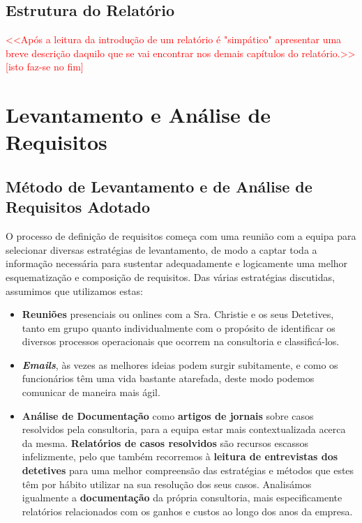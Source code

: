 \documentclass[a4paper,12pt]{scrreprt}
\begin{document}
    \section{Estrutura do Relatório}
        \textcolor{red}{
            <<Após a leitura da introdução de um relatório é "simpático" apresentar uma breve descrição daquilo que se vai encontrar nos demais capítulos do relatório.>>
        } \\
        \textcolor{red}{[isto faz-se no fim]}


\chapter{Levantamento e Análise de Requisitos}
    \section{Método de Levantamento e de Análise de Requisitos Adotado}
            O processo de definição de requisitos começa com uma reunião com a equipa para selecionar diversas estratégias de levantamento, de modo a captar toda a informação necessária para sustentar adequadamente e logicamente uma melhor esquematização e composição de requisitos. Das várias estratégias discutidas, assumimos que utilizamos estas:
            \begin{itemize}
            \item \textbf{Reuniões} presenciais ou onlines com a Sra. Christie e os seus Detetives, tanto em grupo quanto individualmente com o propósito de identificar os diversos processos operacionais que ocorrem na consultoria e classificá-los.
            \item \textit{\textbf{Emails}}, às vezes as melhores ideias podem surgir subitamente, e como os funcionários têm uma vida bastante atarefada, deste modo podemos comunicar de maneira mais ágil.
            \item \textbf{Análise de Documentação} como \textbf{artigos de jornais} sobre casos resolvidos pela consultoria, para a equipa estar mais contextualizada acerca da mesma.
            \textbf{Relatórios de casos resolvidos} são recursos escassos infelizmente, pelo que também recorremos à \textbf{leitura de entrevistas dos detetives} para uma melhor compreensão das estratégias e métodos que estes têm por hábito utilizar na sua resolução dos seus casos. Analisámos igualmente a \textbf{documentação} da própria consultoria, mais especificamente relatórios relacionados com os ganhos e custos ao longo dos anos da empresa.
            \end{itemize}
            
\end{document}
